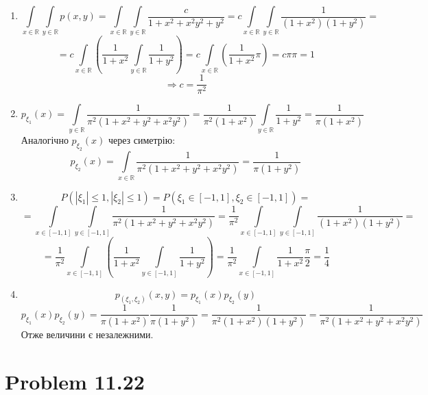 \documentclass[12pt,letterpaper]{article}
\begin{document}
\begin{enumerate}
    \item \[ \int\limits_{x \in \mathbb{R}} \int\limits_{y \in \mathbb{R}} p(x, y) =
        \int\limits_{x \in \mathbb{R}} \int\limits_{y \in \mathbb{R}} \frac{c}{1+x^2+x^2y^2+y^2} =
        c \int\limits_{x \in \mathbb{R}} \int\limits_{y \in \mathbb{R}} \frac{1}{(1+x^2)(1+y^2)} = \]
        \[ = c \int\limits_{x \in \mathbb{R}} \left(\frac{1}{1+x^2} \int\limits_{y \in \mathbb{R}} \frac{1}{1+y^2}\right) =
        c \int\limits_{x \in \mathbb{R}} \left(\frac{1}{1+x^2} \pi \right) =
        c \pi \pi = 1 \]
        \[ \Rightarrow c = \frac{1}{\pi^2} \]

    \item \[ p_{\xi_1}(x) = \int\limits_{y \in \mathbb{R}} \frac{1}{\pi^2 (1 + x^2 + y^2 + x^2 y^2)} =
            \frac{1}{\pi^2 (1+x^2)} \int\limits_{y \in \mathbb{R}} \frac{1}{1 + y^2} =
            \frac{1}{\pi (1+x^2)} \]
        Аналогічно $p_{\xi_2}(x)$ через симетрію:
        \[ p_{\xi_2}(x) = \int\limits_{x \in \mathbb{R}} \frac{1}{\pi^2 (1 + x^2 + y^2 + x^2 y^2)} =
           \frac{1}{\pi (1+y^2)} \]

       \item \[ P(|\xi_1| \leq 1, |\xi_2| \leq 1) = P(\xi_1 \in [-1, 1], \xi_2 \in [-1, 1]) = \]
           \[ = \int\limits_{x \in [-1, 1]} \int\limits_{y \in [-1, 1]} \frac{1}{\pi^2 (1 + x^2 + y^2 + x^2y^2)} =
           \frac{1}{\pi^2} \int\limits_{x \in [-1,1]} \int\limits_{y \in [-1,1]} \frac{1}{(1+x^2)(1+y^2)} = \]
           \[ = \frac{1}{\pi^2} \int\limits_{x \in [-1,1]} \left( \frac{1}{1+x^2}
            \int\limits_{y \in [-1,1]} \frac{1}{1+y^2} \right) =
        \frac{1}{\pi^2} \int\limits_{x \in [-1,1]} \frac{1}{1+x^2} \frac{\pi}{2} = \frac{1}{4} \]

    \item \[ p_{(\xi_1, \xi_2)}(x,y) = p_{\xi_1}(x) p_{\xi_2}(y) \]
        \[ p_{\xi_1}(x) p_{\xi_2}(y) = \frac{1}{\pi (1+x^2)} \frac{1}{\pi (1+y^2)} =
            \frac{1}{\pi^2 (1+x^2)(1+y^2)} = 
        \frac{1}{\pi^2 (1+x^2 + y^2 + x^2y^2)}\]
        Отже величини є незалежними.

\end{enumerate}

\section*{Problem 11.22}
\end{document}
